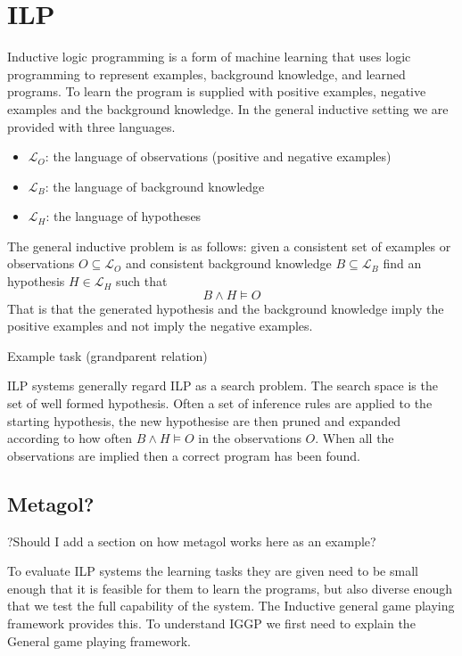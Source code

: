\documentclass[a4paper,12pt]{report}
\begin{document}
\section{ILP}\label{sec:ILP}
Inductive logic programming is a form of machine learning that uses logic programming to represent examples, background knowledge, and learned programs\cite{Cropper/EfficientLearning}. To learn the program is supplied with positive examples, negative examples and the background knowledge. In the general inductive setting we are provided with three languages.
\begin{itemize}
\item $\mathcal{L}_O$: the language of observations (positive and negative examples)
\item $\mathcal{L}_B$: the language of background knowledge
\item $\mathcal{L}_H$: the language of hypotheses 
\end{itemize}
The general inductive problem is as follows: given a consistent set of examples or observations $O \subseteq \mathcal{L}_O$ and consistent background knowledge $B \subseteq \mathcal{L}_B$ find an hypothesis $H \in \mathcal{L}_H$ such that \[B \wedge H \vDash O\] \cite{Muggleton/ILP}
That is that the generated hypothesis and the background knowledge imply the positive examples and not imply the negative examples.

Example task (grandparent relation)

ILP systems generally regard ILP as a search problem. The search space is the set of well formed hypothesis. Often a set of inference rules are applied to the starting hypothesis, the new hypothesise are then pruned and expanded according to how often $B \wedge H \vDash O$ in the observations $O$. When all the observations are implied then a correct program has been found.
\subsection{Metagol?}
?Should I add a section on how metagol works here as an example?


To evaluate ILP systems the learning tasks they are given need to be small enough that it is feasible for them to learn the programs, but also diverse enough that we test the full capability of the system. The Inductive general game playing framework provides this. To understand IGGP we first need to explain the General game playing framework.
\end{document}

